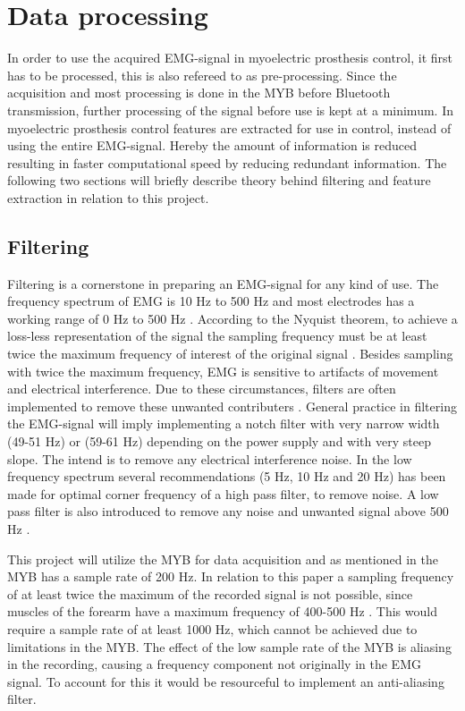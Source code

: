 \section{Data processing}


In order to use the acquired EMG-signal in myoelectric prosthesis control, it first has to be processed, this is also refereed to as pre-processing. Since the acquisition and most processing is done in the MYB before Bluetooth transmission, further processing of the signal before use is kept at a minimum. In myoelectric prosthesis control features are extracted for use in control, instead of using the entire EMG-signal. Hereby the amount of information is reduced resulting in faster computational speed by reducing redundant information. The following two sections will briefly describe theory behind filtering and feature extraction in relation to this project.  


\subsection{Filtering}

Filtering is a cornerstone in preparing an EMG-signal for any kind of use. The frequency spectrum of EMG is 10 Hz to 500 Hz and most electrodes has a working range of 0 Hz to 500 Hz \cite{DeLuca2010}. According to the Nyquist theorem, to achieve a loss-less representation of the signal the sampling frequency must be at least twice the maximum frequency of interest of the original signal \cite{Pozzo2004}. Besides sampling with twice the maximum frequency, EMG is sensitive to artifacts of movement and electrical interference. Due to these circumstances, filters are often implemented to remove these unwanted contributers \cite{DeLuca2010}. 
General practice in filtering the EMG-signal will imply implementing a notch filter with very narrow width (49-51 Hz) or (59-61 Hz) depending on the power supply and with very steep slope. The intend is to remove any electrical interference noise. In the low frequency spectrum several recommendations (5 Hz, 10 Hz and 20 Hz) has been made for optimal corner frequency of a high pass filter, to remove noise. A low pass filter is also introduced to remove any noise and unwanted signal above 500 Hz \cite{Cram2012}. 

This project will utilize the MYB for data acquisition and as mentioned in  the MYB has a sample rate of 200 Hz. In relation to this paper a sampling frequency of at least twice the maximum of the recorded signal is not possible, since muscles of the forearm have a maximum frequency of 400-500 Hz \cite{Cram2012}. This would require a sample rate of at least 1000 Hz, which cannot be achieved due to limitations in the MYB. The effect of the low sample rate of the MYB is aliasing in the recording, causing a frequency component not originally in the EMG signal. To account for this it would be resourceful to implement an anti-aliasing filter.  

